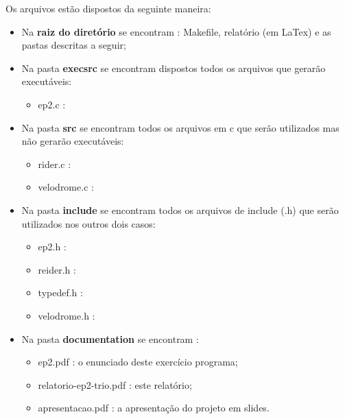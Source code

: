 \documentclass[12pt,a4paper]{article}
\begin{document}
    Os arquivos estão dispostos da seguinte maneira:
    \begin{itemize} %
    
    \item Na \textbf{raiz do diretório} se encontram : Makefile, relatório (em LaTex) e as pastas descritas a seguir;
    \item Na pasta \textbf{execsrc} se encontram dispostos todos os arquivos que gerarão executáveis:
        
    \begin{itemize} %
    \item ep2.c : %
    \end{itemize} %
    
    \item Na pasta \textbf{src} se encontram todos os arquivos em c que serão utilizados mas não gerarão executáveis:
    
    \begin{itemize} %
    \item rider.c : %
    \item velodrome.c : %
    \end{itemize} %
    
    \item Na pasta \textbf{include} se encontram todos os arquivos de include (.h) que serão utilizados nos outros dois casos:
     
    \begin{itemize} %
    \item ep2.h : %
    \item reider.h : %
    \item typedef.h : %
    \item velodrome.h : %
    \end{itemize} %
    
    \item Na pasta \textbf{documentation} se encontram :
    
        \begin{itemize} %
        \item ep2.pdf : o enunciado deste exercício programa;
        \item relatorio-ep2-trio.pdf : este relatório;
        \item apresentacao.pdf : a apresentação do projeto em slides.
        \end{itemize} %
        

\end{itemize}
\end{document}
